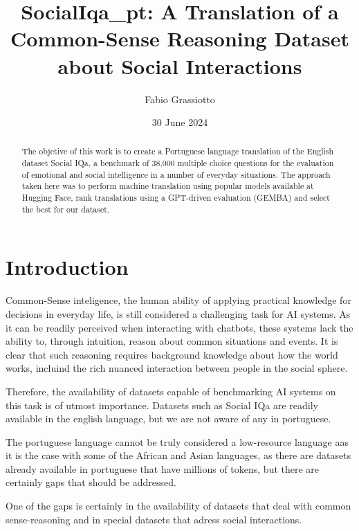 \documentclass{article}
\title{SocialIqa\_pt: A Translation of a Common-Sense Reasoning Dataset about Social Interactions}
\author{Fabio Grassiotto}
\date{30 June 2024}
\begin{document}
\maketitle

\begin{abstract}
    The objetive of this work is to create a Portuguese language translation of
    the English dataset Social IQa, a benchmark of 38,000 multiple choice
    questions for the evaluation of emotional and social intelligence in a
    number of everyday situations. The approach taken here was to perform
    machine translation using popular models available at Hugging Face, rank
    translations using a GPT-driven evaluation (GEMBA) and select the best for
    our dataset.
\end{abstract}

\section{Introduction}

Common-Sense inteligence, the human ability of applying practical knowledge for
decisions in everyday life, is still considered a challenging task for AI
systems. As it can be readily perceived when interacting with chatbots, these
systems lack the ability to, through intuition, reason about common situations
and events. It is clear that such reasoning requires background knowledge about
how the world works, incluind the rich nuanced interaction between people in the
social sphere. \cite{choi2022curious, krause2023commonsense}

Therefore, the availability of datasets capable of benchmarking AI systems on
this task is of utmost importance. Datasets such as Social IQa are readily
available in the english language, but we are not aware of any in portuguese.
\cite{sap2019socialiqa}

The portuguese language cannot be truly considered a low-resource language aas
it is the case with some of the African and Asian languages, as there are
datasets already available in portuguese that have millions of tokens, but there
are certainly gaps that should be addressed. \cite{ghafoor2021impact}

One of the gaps is certainly in the availability of datasets that deal with
common sense-reasoning and in special datasets that adress social interactions.
\end{document}
